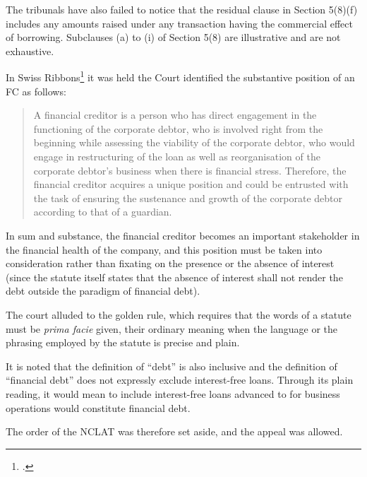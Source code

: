 \documentclass[12pt]{article}
\begin{document}
The tribunals have also failed to notice that the residual clause in Section 5(8)(f) includes any amounts raised under any transaction having the commercial effect of borrowing. Subclauses (a) to (i) of Section 5(8) are illustrative and are not exhaustive.

In Swiss Ribbons\footcite{justicer.fnarimanSwissRibbonsPvt2019} it was held the Court identified the substantive position of an FC as follows:

\begin{quote}
  A financial creditor is a person who has direct engagement in the functioning of the corporate debtor, who is involved right from the beginning while assessing the viability of the corporate debtor, who would engage in restructuring of the loan as well as reorganisation of the corporate debtor's business when there is financial stress. Therefore, the financial creditor acquires a unique position and could be entrusted with the task of ensuring the sustenance and growth of the corporate debtor according to that of a guardian. 
\end{quote}

In sum and substance, the financial creditor becomes an important stakeholder in the financial health of the company, and this position must be taken into consideration rather than fixating on the presence or the absence of interest (since the statute itself states that the absence of interest shall not render the debt outside the paradigm of financial debt). 


The court alluded to the golden rule, which requires that the words of a statute must be \textit{prima facie} given, their ordinary meaning when the language or the phrasing employed by the statute is precise and plain.


It is noted that the definition of ``debt'' is also inclusive and the definition of ``financial debt'' does not expressly exclude interest-free loans. Through its plain reading, it would mean to include interest-free loans advanced to for business operations would constitute financial debt.

The order of the NCLAT was therefore set aside, and the appeal was allowed. 
\end{document}
